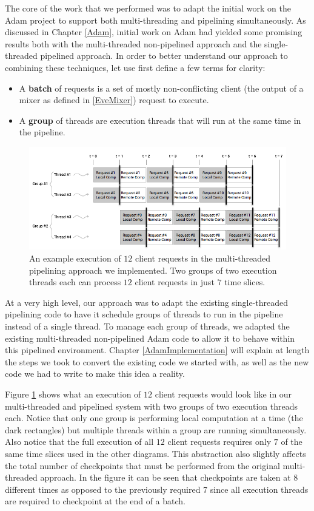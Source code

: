 \documentclass[11pt, oneside]{report}
\begin{document}
The core of the work that we performed was to adapt the initial work on the Adam project to support both multi-threading and pipelining simultaneously.
As discussed in Chapter \ref{Adam}, initial work on Adam had yielded some promising results both with the multi-threaded non-pipelined approach and the single-threaded pipelined approach. 
In order to better understand our approach to combining these techniques, let use first define a few terms for clarity:
\begin{itemize}
\item A \textbf{batch} of requests is a set of mostly non-conflicting client (the output of a mixer as defined in \ref{EveMixer}) request to execute.
\item A \textbf{group} of threads are execution threads that will run at the same time in the pipeline.
\end{itemize}

\begin{figure}[h]
\centering
\includegraphics[width=1.0\textwidth]{PipelinedParallel.png}
\caption{\label{parpipe}An example execution of $12$ client requests in the multi-threaded pipelining approach we implemented. Two groups of two execution threads each can process $12$ client requests in just $7$ time slices.}
\end{figure}

At a very high level, our approach was to adapt the existing single-threaded pipelining code to have it schedule groups of threads to run in the pipeline instead of a single thread. 
To manage each group of threads, we adapted the existing multi-threaded non-pipelined Adam code to allow it to behave within this pipelined environment. 
Chapter \ref{AdamImplementation} will explain at length the steps we took to convert the existing code we started with, as well as the new code we had to write to make this idea a reality.

Figure \ref{parpipe} shows what an execution of $12$ client requests would look like in our multi-threaded and pipelined system with two groups of two execution threads each. 
Notice that only one group is performing local computation at a time (the dark rectangles) but multiple threads within a group are running simultaneously.
Also notice that the full execution of all $12$ client requests requires only $7$ of the same time slices used in the other diagrams.
This abstraction also slightly affects the total number of checkpoints that must be performed from the original multi-threaded approach. 
In the figure it can be seen that checkpoints are taken at 8 different times as opposed to the previously required 7 since all execution threads are required to checkpoint at the end of a batch.
\end{document}
